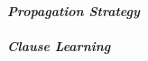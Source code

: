 \paragraph {\em \textbf{Propagation Strategy}}      

\paragraph {\em \textbf{Clause Learning}}      


